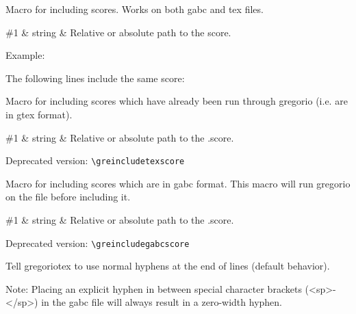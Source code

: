 Macro for including scores.  Works on both gabc and tex files.

\begin{argtable}
  \#1 & string & Relative or absolute path to the score.\\
\end{argtable}

Example:\par\medskip
\begin{latexcode}

  The following lines include the same score:
\end{latexcode}

Macro for including scores which have already been run through
gregorio (i.e. are in gtex format).

\begin{argtable}
  \#1 & string & Relative or absolute path to the .\@gtex score.\\
\end{argtable}

\smallskip\hspace{15pt} Deprecated version: \verb=\greincludetexscore=

Macro for including scores which are in gabc format.  This macro will
run gregorio on the file before including it.

\begin{argtable}
  \#1 & string & Relative or absolute path to the .\@gabc score.\\
\end{argtable}

\smallskip\hspace{15pt} Deprecated version: \verb=\greincludegabcscore=

Tell gregoriotex to use normal hyphens at the end of lines (default
behavior).

Note: Placing an explicit hyphen in between special character brackets
(\ie <sp>-</sp>) in the gabc file will always result in a zero-width
hyphen.

